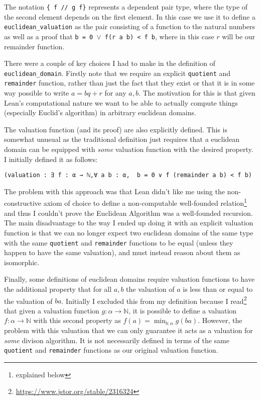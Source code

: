 \documentclass{article}
\newcommand{\N}{\ensuremath{\mathbb{N}}}
\renewcommand{\a}{\alpha}
\newcommand{\ct}{\texttt}
\begin{document}
The notation \ct{\{ f // g f\}} represents a dependent pair type, where the type of the second element depends on the first element.
In this case we use it to define a \ct{euclidean\_valuation} as the pair consisting of a function to the natural numbers as well as a proof that \ct{b = 0 $\lor$ f(r a b) < f b}, where in this case $r$ will be our remainder function.

There were a couple of key choices I had to make in the definition of \ct{euclidean\_domain}.
Firstly note that we require an explicit \ct{quotient} and \ct{remainder} function, rather than just the fact that they exist or that it is in some way possible to write $a=bq+r$ for any $a,b$.
The motivation for this is that given Lean's computational nature we want to be able to actually compute things (especially Euclid's algorithm) in arbitrary euclidean domains.

The valuation function (and its proof) are also explicitly defined. This is somewhat unusual as the traditional definition just requires that a euclidean domain can be equipped with \textit{some} valuation function with the desired property. I initially defined it as follows:
\begin{lstlisting}
(valuation : ∃ f : α → ℕ,∀ a b : α,  b = 0 ∨ f (remainder a b) < f b)
\end{lstlisting}
The problem with this approach was that Lean didn't like me using the non-constructive axiom of choice to define a non-computable well-founded relation\footnote{explained below} and thus I couldn't prove the Euclidean Algorithm was a well-founded recursion. 
The main disadvantage to the way I ended up doing it with an explicit valuation function is that we can no longer expect two euclidean domains of the same type with the same \ct{quotient} and \ct{remainder} functions to be equal (unless they happen to have the same valuation), and must instead reason about them as isomorphic.

Finally, some definitions of euclidean domains require valuation functions to have the additional property that for all $a,b$ the valuation of $a$ is less than or equal to the valuation of $ba$. 
Initially I excluded this from my definition because I read\footnote{\url{https://www.jstor.org/stable/2316324}} that given a valuation function $g:\a \to \N$, it is possible to define a valuation $f:\a \to \N$ with this second property as $f(a)=\min_{b:\a}g(ba)$.
However, the problem with this valuation that we can only guarantee it acts as a valuation for \textit{some} divison algorithm.
It is not necessarily defined in terms of the same \ct{quotient} and \ct{remainder} functions as our original valuation function.
\end{document}
